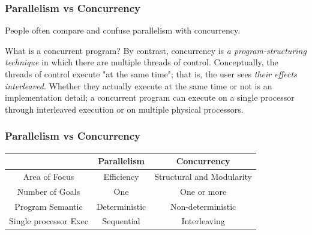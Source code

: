 \documentclass{beamer}
\newcommand{\beb}{\begin{exampleblock}}
\newcommand{\eeb}{\end{exampleblock}}
\newcommand{\redtxt}[1]{{\red #1}}
\begin{document}
\begin{frame}[fragile]
\frametitle{Parallelism vs Concurrency}

People often compare and confuse parallelism with concurrency.
\beb{What is a concurrent program?}
By contrast, concurrency is {\em a \redtxt{program-structuring technique}} in which
there are multiple threads of control. Conceptually, the threads of
control execute "at the same time"; that is, the user sees {\em
  \redtxt{their effects interleaved}}. Whether they actually execute at the same 
time or not is an implementation detail; a concurrent program 
can execute on a single processor through interleaved execution or 
on multiple physical processors.
\eeb
\end{frame}



\begin{frame}[fragile]
\frametitle{Parallelism vs Concurrency}

\begin{tabular}{|c|c|c|}
\hline
   & Parallelism & Concurrency \\ \hline \hline
Area of Focus & Efficiency & Structural and Modularity \\ \hline
Number of Goals & One & One or more \\ \hline
Program Semantic & Deterministic & Non-deterministic \\ \hline
Single processor Exec & Sequential & Interleaving   \\ \hline \hline

\end{tabular}

\end{frame}
\end{document}
